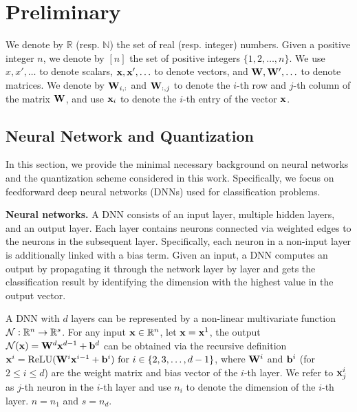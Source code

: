 \section{Preliminary}\label{sec:pre}

We denote by $\mathbb{R}$ (resp. $\mathbb{N}$) the set of real (resp. integer) numbers.
Given a positive integer $n$,  we denote by $[n]$ the set of positive integers $\{1,2, \ldots, n\}$.
We use $x,x',\ldots$ to denote scalars, ${\mathbf{x}}, {\mathbf{x}}',\ldots$ to denote vectors, and ${\mathbf{W}}, {\mathbf{W}}',\ldots$ to denote matrices. We denote by ${\mathbf{W}}_{i,:}$ and ${\mathbf{W}}_{:,j}$ to denote the $i$-th row and $j$-th column of the matrix ${\mathbf{W}}$, and use ${\mathbf{x}}_i$ to denote the $i$-th entry of the vector ${\mathbf{x}}$.


\subsection{Neural Network and Quantization}\label{sec:quant}
In this section, we provide the minimal necessary background on neural networks and the quantization scheme considered in this work. Specifically, we focus on feedforward deep neural networks (DNNs) used for classification problems.

\smallskip
\noindent
{\bf Neural networks.}
% 
A DNN consists of an input layer, multiple hidden layers, and an output layer. Each layer contains neurons connected via weighted edges to the neurons in the subsequent layer. Specifically, each neuron in a non-input layer is additionally linked with a bias term. Given an input, a DNN computes an output by propagating it through the network layer by layer and gets the classification result by identifying the dimension with the highest value in the output vector.

A DNN with $d$ layers can be represented by a non-linear multivariate function ${\mathcal{N}}: \mathbb{R}^n \rightarrow \mathbb{R}^s$. For any input ${\mathbf{x}}\in\mathbb{R}^n$, let ${\mathbf{x}}={\mathbf{x}}^1$, the output ${\mathcal{N}}({\mathbf{x}})={\mathbf{W}}^d {\mathbf{x}}^{d-1}+{\mathbf{b}}^d$ can be obtained via the recursive definition ${\mathbf{x}}^{i}=\text{ReLU}({\mathbf{W}}^{i} {\mathbf{x}}^{i-1}+{\mathbf{b}}^{i}) \text{ for } i\in\{2,3,\ldots, d-1\}$, where ${\mathbf{W}}^i$ and ${\mathbf{b}}^i$ (for $2\le i\le d$) are the weight matrix and bias vector of the $i$-th layer. We refer to ${\mathbf{x}}^i_j$ as $j$-th neuron in the $i$-th layer and use $n_i$ to denote the dimension of the $i$-th layer. $n=n_1$ and $s=n_d$.

